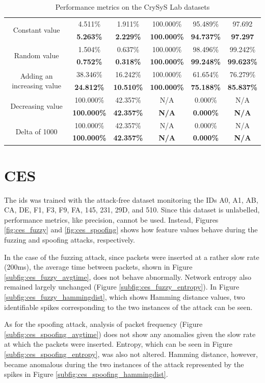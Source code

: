 \begin{table}
\begin{tabular}{*{6}{c}}
        \midrule
        \multirow{2}{*}{Constant value} & 4.511\% & 1.911\% & 100.000\% & 95.489\% & 97.692\\
        & \textbf{5.263\%} & \textbf{2.229\%} & \textbf{100.000\%} & \textbf{94.737\%} & \textbf{97.297}\\
        \multirow{2}{*}{Random value} & 1.504\% & 0.637\% & 100.000\% & 98.496\% & 99.242\%\\
        & \textbf{0.752\%} & \textbf{0.318\%} & \textbf{100.000\%} & \textbf{99.248\%} & \textbf{99.623\%}\\
        \multirow{2}{*}{Adding an increasing value} & 38.346\% & 16.242\% & 100.000\% & 61.654\% & 76.279\%\\
        & \textbf{24.812\%} & \textbf{10.510\%} & \textbf{100.000\%} & \textbf{75.188\%} & \textbf{85.837\%}\\
        \multirow{2}{*}{Decreasing value} & 100.000\% & 42.357\% & N/A & 0.000\% & N/A\\
        & \textbf{100.000\%} & \textbf{42.357\%} & \textbf{N/A} & \textbf{0.000\%} & \textbf{N/A}\\
        \multirow{2}{*}{Delta of 1000} & 100.000\% & 42.357\% & N/A & 0.000\% & N/A\\
        & \textbf{100.000\%} & \textbf{42.357\%} & \textbf{N/A} & \textbf{0.000\%} & \textbf{N/A}\\
        \bottomrule
    \end{tabular}
    \caption{Performance metrics on the CrySyS Lab datasets}
    \label{tab:perf_crysys}
\end{table}

\section{CES}

The \gls{ids} was trained with the attack-free dataset monitoring the IDs A0, A1, AB, CA, DE, F1, F3, F9, FA, 145, 231, 29D, and 510. Since this dataset is unlabelled, performance metrics, like precision, cannot be used. Instead, Figures \ref{fig:ces_fuzzy} and \ref{fig:ces_spoofing} shows how feature values behave during the fuzzing and spoofing attacks, respectively.\par
In the case of the fuzzing attack, since packets were inserted at a rather slow rate (200ms), the average time between packets, shown in Figure \ref{subfig:ces_fuzzy_avgtime}, does not behave abnormally. Network entropy also remained largely unchanged (Figure \ref{subfig:ces_fuzzy_entropy}). In Figure \ref{subfig:ces_fuzzy_hammingdist}, which shows Hamming distance values, two identifiable spikes corresponding to the two instances of the attack can be seen.\par
As for the spoofing attack, analysis of packet frequency (Figure \ref{subfig:ces_spoofing_avgtime}) does not show any anomalies given the slow rate at which the packets were inserted. Entropy, which can be seen in Figure \ref{subfig:ces_spoofing_entropy}, was also not altered. Hamming distance, however, became anomalous during the two instances of the attack represented by the spikes in Figure \ref{subfig:ces_spoofing_hammingdist}.

